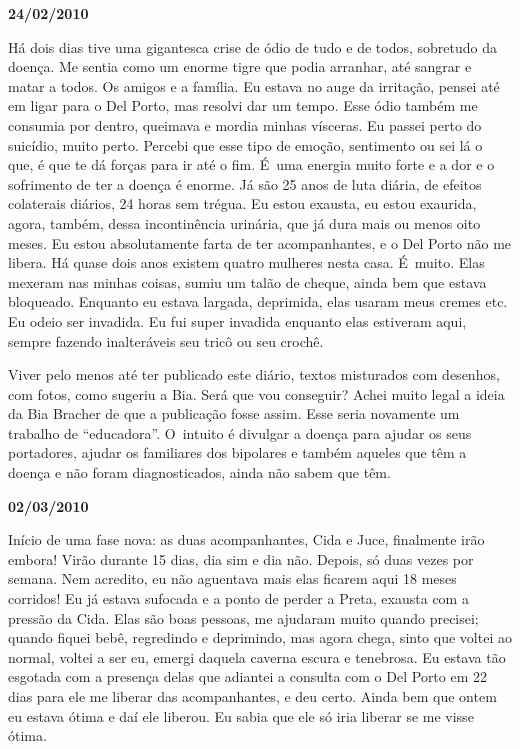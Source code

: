 \begin{center}\textbf{\asterisc{}}\end{center}


\begin{flushright}\textbf{24/02/2010}\end{flushright}


Há dois dias tive uma gigantesca crise de ódio de tudo e de todos,
sobretudo da doença. Me sentia como um enorme tigre que podia arranhar,
até sangrar e matar a todos. Os amigos e a família. Eu estava no auge da
irritação, pensei até em ligar para o Del Porto, mas resolvi dar um
tempo. Esse ódio também me consumia por dentro, queimava e mordia minhas
vísceras. Eu passei perto do suicídio, muito perto. Percebi que esse
tipo de emoção, sentimento ou sei lá o que, é que te dá forças para ir
até o fim. É~uma energia muito forte e a dor e o sofrimento de ter a
doença é enorme. Já são 25 anos de luta diária, de efeitos colaterais
diários, 24 horas sem trégua. Eu estou exausta, eu estou exaurida,
agora, também, dessa incontinência urinária, que já dura mais ou menos
oito meses. Eu estou absolutamente farta de ter acompanhantes, e o Del
Porto não me libera. Há quase dois anos existem quatro mulheres nesta
casa. É~muito. Elas mexeram nas minhas coisas, sumiu um talão de cheque,
ainda bem que estava bloqueado. Enquanto eu estava largada, deprimida,
elas usaram meus cremes etc. Eu odeio ser invadida. Eu fui super
invadida enquanto elas estiveram aqui, sempre fazendo inalteráveis seu
tricô ou seu crochê.

Viver pelo menos até ter publicado este diário, textos misturados com
desenhos, com fotos, como sugeriu a Bia. Será que vou conseguir? Achei
muito legal a ideia da Bia Bracher de que a publicação fosse assim. Esse
seria novamente um trabalho de ``educadora''. O~intuito é divulgar a
doença para ajudar os seus portadores, ajudar os familiares dos
bipolares e também aqueles que têm a doença e não foram diagnosticados,
ainda não sabem que têm.

\begin{center}\textbf{\asterisc{}}\end{center}


\textbf{}

\begin{flushright}\textbf{02/03/2010}\end{flushright}


Início de uma fase nova: as duas acompanhantes, Cida e Juce, finalmente
irão embora! Virão durante 15 dias, dia sim e dia não. Depois, só duas
vezes por semana. Nem acredito, eu não aguentava mais elas ficarem aqui
18 meses corridos! Eu já estava sufocada e a ponto de perder a Preta,
exausta com a pressão da Cida. Elas são boas pessoas, me ajudaram muito
quando precisei; quando fiquei bebê, regredindo e deprimindo, mas agora
chega, sinto que voltei ao normal, voltei a ser eu, emergi daquela
caverna escura e tenebrosa. Eu estava tão esgotada com a presença delas
que adiantei a consulta com o Del Porto em 22 dias para ele me liberar
das acompanhantes, e deu certo. Ainda bem que ontem eu estava ótima e
daí ele liberou. Eu sabia que ele só iria liberar se me visse ótima.

